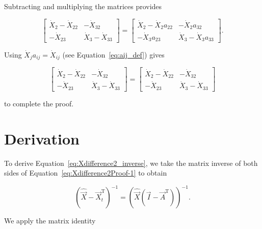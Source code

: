 \noindent{}Subtracting and multiplying the matrices provides

\begin{equation} \label{eq:Xdifference2Proof-3}
	\begin{bmatrix} 	
		\dot{X}_{2} - \dot{X}_{22} & - \dot{X}_{32}	\\
		- \dot{X}_{23}             & \dot{X}_{3} - \dot{X}_{33}
	\end{bmatrix} 
	= 
	\begin{bmatrix} 	
		\dot{X}_{2} - \dot{X}_2 a_{22} & - \dot{X}_2 a_{32}	\\
		- \dot{X}_3 a_{23}             & \dot{X}_{3} - \dot{X}_3 a_{33}
	\end{bmatrix}.
\end{equation}

\noindent{}Using $\dot{X}_j a_{ij} = \dot{X}_{ij}$ (see Equation~\ref{eq:aij_def}) gives

\begin{equation} \label{eq:Xdifference2Proof-4}
	\begin{bmatrix} 	
		\dot{X}_{2} - \dot{X}_{22} & - \dot{X}_{32}	\\
		- \dot{X}_{23}             & \dot{X}_{3} - \dot{X}_{33}
	\end{bmatrix} 
	= 
	\begin{bmatrix} 	
		\dot{X}_{2} - \dot{X}_{22} & - \dot{X}_{32}	\\
		- \dot{X}_{23}             & \dot{X}_{3} - \dot{X}_{33}
	\end{bmatrix}
\end{equation}

\noindent{}to complete the proof.


\section{Derivation}

To derive Equation~\ref{eq:Xdifference2_inverse}, 
we take the matrix inverse of both sides 
of Equation~\ref{eq:Xdifference2Proof-1} to obtain

\begin{equation} \label{eq:Xdifference2_inverse_Proof-5}
	{\left(\hat{\vec{X}} - \vec{X}_t^\mathrm{T}\right)}^{-1} 
	= {\left(\hat{\vec{X}}(\vec{I} - \vec{A}^\mathrm{T})\right)}^{-1}.
\end{equation}

\noindent We apply the matrix identity~\cite[Formula 6.2, p. 308]{Beyer:1991vd}

